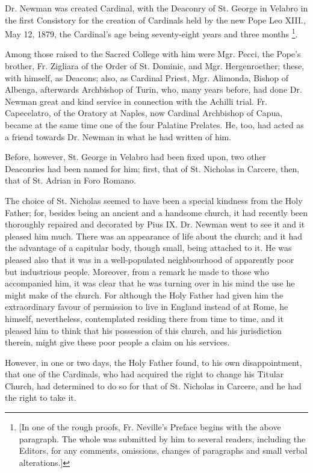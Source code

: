 Dr. Newman was created Cardinal, with the Deaconry of St. George in
Velabro in the first Consistory for the creation of Cardinals held by
the new Pope Leo XIII., May 12, 1879, the Cardinal's age being
seventy-eight years and three months \footnote{[In one of the
rough proofs, Fr. Neville's Preface begins with the above paragraph.
The whole was submitted by him to several readers, including the
Editors, for any comments, omissions, changes of paragraphs and small
verbal alterations.]}.

Among those raised to the Sacred College with him were Mgr. Pecci,
the Pope's brother, Fr. Zigliara of the Order of St. Dominic, and Mgr.
Hergenroether; these, with himself, as Deacons; also, as Cardinal
Priest, Mgr. Alimonda, Bishop of Albenga, afterwards Archbishop of
Turin, who, many years before, had done Dr. Newman great and kind
service in connection with the Achilli trial. Fr. Capecelatro, of the
Oratory at Naples, now Cardinal Archbishop of Capua, became at the
same time one of the four Palatine Prelates. He, too, had acted as a
friend towards Dr. Newman in what he had written of him.

Before, however, St. George in Velabro had been fixed upon, two
other Deaconries had been named for him; first, that of St.
Nicholas in Carcere, then, that of St. Adrian in Foro Romano.

The choice of St. Nicholas seemed to have been a special kindness
from the Holy Father; for, besides being an ancient and a handsome
church, it had recently been thoroughly repaired and decorated by Pius
IX. Dr. Newman went to see it and it pleased him much. There was an
appearance of life about the church; and it had the advantage of a
capitular body, though small, being attached to it. He was pleased
also that it was in a well-populated neighbourhood of apparently poor
but industrious people. Moreover, from a remark he made to those who
accompanied him, it was clear that he was turning over in his mind the
use he might make of the church. For although the Holy Father had
given him the extraordinary favour of permission to live in England
instead of at Rome, he himself, nevertheless, contemplated residing
there from time to time, and it pleased him to think that his
possession of this church, and his jurisdiction therein, might give
these poor people a claim on his services.

However, in one or two days, the Holy Father found, to his own
disappointment, that one of the Cardinals, who had acquired the right
to change his Titular Church, had determined to do so for that of St.
Nicholas in Carcere, and he had the right to take it.

